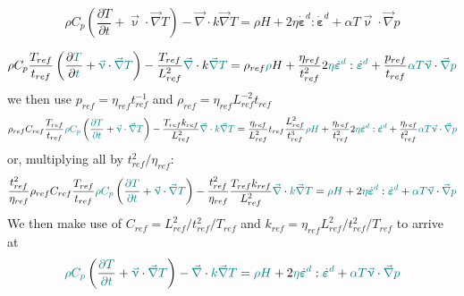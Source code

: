 \[
\rho C_p \left(\frac{\partial T}{\partial t} + \vec \upnu\cdot\vec\nabla T\right)
- \vec\nabla\cdot k\vec\nabla T 
= \rho H + 2\eta\dot{\bm \varepsilon}^d : \dot{\bm \varepsilon}^d 
+\alpha T  \vec\upnu \cdot \vec\nabla p 
\]

\[
\rho C_p \frac{T_{ref}}{t_{ref}} \left(\frac{\partial {\color{teal}T}}{\partial {\color{teal}t}} 
+ {\color{teal} \vec \upnu}\cdot {\color{teal}\vec\nabla} {\color{teal}T}\right)
- \frac{T_{ref}}{L_{ref}^2} {\color{teal}\vec\nabla}\cdot k
{\color{teal}\vec\nabla} {\color{teal}T} 
= \rho_{ref} {\color{teal}\rho} H + \frac{\eta_{ref}}{t_{ref}^2} 2 {\color{teal}\eta} 
{\color{teal}\dot{\bm \varepsilon}^d} : 
{\color{teal}\dot{\bm \varepsilon}^d} 
+ \frac{p_{ref}}{t_{ref}} {\color{teal} \alpha T}  
{\color{teal}\vec\upnu} \cdot {\color{teal} \vec\nabla}
{\color{teal} p} 
\]
we then use $p_{ref} = \eta_{ref} t_{ref}^{-1}$ and
$\rho_{ref} = \eta_{ref} L_{ref}^{-2} t_{ref}$
\[
\rho_{ref} C_{ref} \frac{T_{ref}}{t_{ref}} {\color{teal} \rho} {\color{teal}C_p} 
\left(\frac{ {\color{teal} \partial T}}{ {\color{teal} \partial t}} 
+ {\color{teal} \vec \upnu}\cdot {\color{teal}\vec\nabla} {\color{teal}T}\right)
- \frac{T_{ref} k_{ref}}{L_{ref}^2} 
{\color{teal}\vec\nabla}\cdot {\color{teal} k}
{\color{teal}\vec\nabla} {\color{teal}T} 
= \frac{\eta_{ref}}{L_{ref}^2} t_{ref}  \frac{L_{ref}^2}{t_{ref}^3} 
{\color{teal}\rho} {\color{teal} H} 
+ \frac{\eta_{ref}}{t_{ref}^2} 2 {\color{teal}\eta} 
{\color{teal}\dot{\bm \varepsilon}^d} : 
{\color{teal}\dot{\bm \varepsilon}^d} 
+ \frac{\eta_{ref}}{t_{ref}^2} {\color{teal} \alpha T}  
{\color{teal}\vec\upnu} \cdot {\color{teal} \vec\nabla}
{\color{teal} p} 
\]
or, multiplying all by $t^2_{ref}/\eta_{ref}$:
\[
\frac{t_{ref}^2}{\eta_{ref}}
\rho_{ref} C_{ref} \frac{T_{ref}}{t_{ref}} {\color{teal} \rho} {\color{teal}C_p} 
\left(\frac{ {\color{teal} \partial T}}{ {\color{teal} \partial t}} 
+ {\color{teal} \vec \upnu}\cdot {\color{teal}\vec\nabla} {\color{teal}T}\right)
- \frac{t_{ref}^2}{\eta_{ref}} \frac{T_{ref} k_{ref}}{L_{ref}^2} 
{\color{teal}\vec\nabla}\cdot {\color{teal} k}
{\color{teal}\vec\nabla} {\color{teal}T} 
=  
{\color{teal}\rho} {\color{teal} H} 
+  2 {\color{teal}\eta} 
{\color{teal}\dot{\bm \varepsilon}^d} : 
{\color{teal}\dot{\bm \varepsilon}^d} 
+  {\color{teal} \alpha T}  
{\color{teal}\vec\upnu} \cdot {\color{teal} \vec\nabla}
{\color{teal} p} 
\]
We then make use of $C_{ref}=L_{ref}^2 /t_{ref}^2/T_{ref}$
and $k_{ref}= \eta_{ref} L_{ref}^2/t_{ref}^2/T_{ref}$
to arrive at
\[
{\color{teal} \rho} {\color{teal}C_p} 
\left(\frac{ {\color{teal} \partial T}}{ {\color{teal} \partial t}} 
+ {\color{teal} \vec \upnu}\cdot {\color{teal}\vec\nabla} {\color{teal}T}\right)
- 
{\color{teal}\vec\nabla}\cdot {\color{teal} k}
{\color{teal}\vec\nabla} {\color{teal}T} 
=  
{\color{teal}\rho} {\color{teal} H} 
+  2 {\color{teal}\eta} 
{\color{teal}\dot{\bm \varepsilon}^d} : 
{\color{teal}\dot{\bm \varepsilon}^d} 
+  {\color{teal} \alpha T}  
{\color{teal}\vec\upnu} \cdot {\color{teal} \vec\nabla}
{\color{teal} p} 
\]



